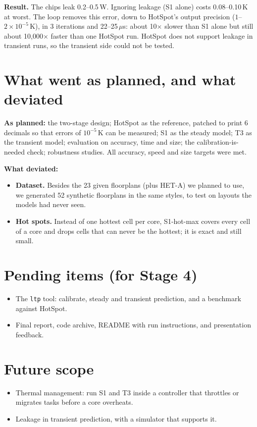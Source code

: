\documentclass[11pt,a4paper]{article}
\newcommand{\us}{\,$\mu$s}
\begin{document}
\textbf{Result.} The chips leak 0.2--0.5\,W. Ignoring leakage (S1 alone) costs 0.08--0.10\,K at
worst. The loop removes this error, down to HotSpot's output precision ($1$--$2\times10^{-5}$\,K),
in 3 iterations and 22--25\us: about 10$\times$ slower than S1 alone but still about
10{,}000$\times$ faster than one HotSpot run. HotSpot does not support leakage in transient runs,
so the transient side could not be tested.

\section{What went as planned, and what deviated}
\textbf{As planned:} the two-stage design; HotSpot as the reference, patched to print 6 decimals so
that errors of $10^{-5}$\,K can be measured; S1 as the steady model; T3 as the transient model;
evaluation on accuracy, time and size; the calibration-is-needed check; robustness studies. All
accuracy, speed and size targets were met.

\textbf{What deviated:}
\begin{itemize}
  \item \textbf{Dataset.} Besides the 23 given floorplans (plus HET-A) we planned to use, we
        generated 52 synthetic floorplans in the same styles, to test on layouts the models had
        never seen.
  \item \textbf{Hot spots.} Instead of one hottest cell per core, S1-hot-max covers every cell of a
        core and drops cells that can never be the hottest; it is exact and still small.
\end{itemize}

\section{Pending items (for Stage 4)}
\begin{itemize}
  \item The \texttt{ltp} tool: calibrate, steady and transient prediction, and a benchmark against
        HotSpot.
  \item Final report, code archive, README with run instructions, and presentation feedback.
\end{itemize}

\section{Future scope}
\begin{itemize}
  \item Thermal management: run S1 and T3 inside a controller that throttles or migrates tasks
        before a core overheats.
  \item Leakage in transient prediction, with a simulator that supports it.
\end{itemize}
\end{document}
